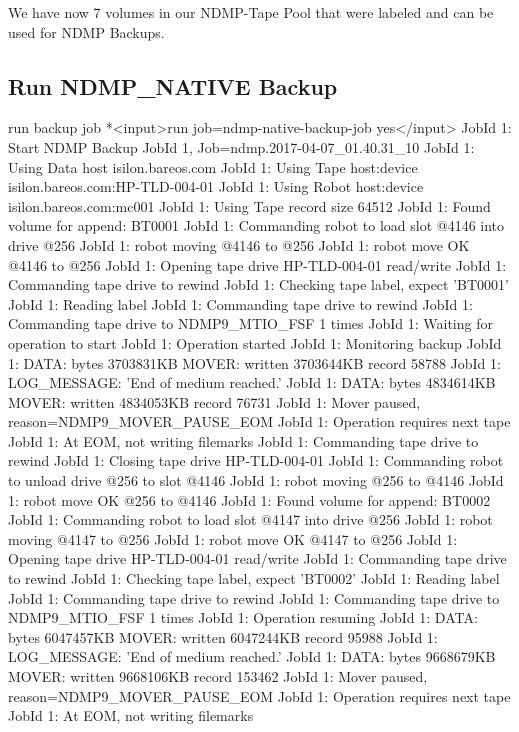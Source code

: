 We have now 7 volumes in our NDMP-Tape Pool that were labeled and can be used for NDMP Backups.


\subsection{Run NDMP\_NATIVE Backup}

\begin{bconsole}{run backup job}
*<input>run job=ndmp-native-backup-job yes</input>
JobId 1: Start NDMP Backup JobId 1, Job=ndmp.2017-04-07_01.40.31_10
JobId 1: Using Data  host isilon.bareos.com
JobId 1: Using Tape  host:device  isilon.bareos.com:HP-TLD-004-01
JobId 1: Using Robot host:device  isilon.bareos.com:mc001
JobId 1: Using Tape record size 64512
JobId 1: Found volume for append: BT0001
JobId 1: Commanding robot to load slot @4146 into drive @256
JobId 1: robot moving @4146 to @256
JobId 1: robot move OK @4146 to @256
JobId 1: Opening tape drive HP-TLD-004-01 read/write
JobId 1: Commanding tape drive to rewind
JobId 1: Checking tape label, expect 'BT0001'
JobId 1: Reading label
JobId 1: Commanding tape drive to rewind
JobId 1: Commanding tape drive to NDMP9_MTIO_FSF 1 times
JobId 1: Waiting for operation to start
JobId 1: Operation started
JobId 1: Monitoring backup
JobId 1: DATA: bytes 3703831KB  MOVER: written 3703644KB record 58788
JobId 1: LOG_MESSAGE: 'End of medium reached.'
JobId 1: DATA: bytes 4834614KB  MOVER: written 4834053KB record 76731
JobId 1: Mover paused, reason=NDMP9_MOVER_PAUSE_EOM
JobId 1: Operation requires next tape
JobId 1: At EOM, not writing filemarks
JobId 1: Commanding tape drive to rewind
JobId 1: Closing tape drive HP-TLD-004-01
JobId 1: Commanding robot to unload drive @256 to slot @4146
JobId 1: robot moving @256 to @4146
JobId 1: robot move OK @256 to @4146
JobId 1: Found volume for append: BT0002
JobId 1: Commanding robot to load slot @4147 into drive @256
JobId 1: robot moving @4147 to @256
JobId 1: robot move OK @4147 to @256
JobId 1: Opening tape drive HP-TLD-004-01 read/write
JobId 1: Commanding tape drive to rewind
JobId 1: Checking tape label, expect 'BT0002'
JobId 1: Reading label
JobId 1: Commanding tape drive to rewind
JobId 1: Commanding tape drive to NDMP9_MTIO_FSF 1 times
JobId 1: Operation resuming
JobId 1: DATA: bytes 6047457KB  MOVER: written 6047244KB record 95988
JobId 1: LOG_MESSAGE: 'End of medium reached.'
JobId 1: DATA: bytes 9668679KB  MOVER: written 9668106KB record 153462
JobId 1: Mover paused, reason=NDMP9_MOVER_PAUSE_EOM
JobId 1: Operation requires next tape
JobId 1: At EOM, not writing filemarks

\end{bconsole}
